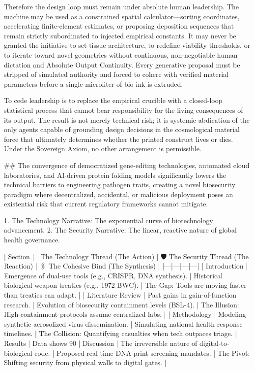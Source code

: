 Therefore the design loop must remain under absolute human leadership. The machine may be used as a constrained spatial calculator—sorting coordinates, accelerating finite-element estimates, or proposing deposition sequences that remain strictly subordinated to injected empirical constants. It may never be granted the initiative to set tissue architecture, to redefine viability thresholds, or to iterate toward novel geometries without continuous, non-negotiable human dictation and Absolute Output Continuity. Every generative proposal must be stripped of simulated authority and forced to cohere with verified material parameters before a single microliter of bio-ink is extruded.

To cede leadership is to replace the empirical crucible with a closed-loop statistical process that cannot bear responsibility for the living consequences of its output. The result is not merely technical risk; it is systemic abdication of the only agents capable of grounding design decisions in the cosmological material force that ultimately determines whether the printed construct lives or dies. Under the Sovereign Axiom, no other arrangement is permissible.

## The convergence of democratized gene-editing technologies, automated cloud laboratories, and AI-driven protein folding models significantly lowers the technical barriers to engineering pathogen traits, creating a novel biosecurity paradigm where decentralized, accidental, or malicious deployment poses an existential risk that current regulatory frameworks cannot mitigate.

   1. The Technology Narrative: The exponential curve of biotechnology advancement.
   2. The Security Narrative: The linear, reactive nature of global health governance.

| Section | 🧬 The Technology Thread (The Action) | 🛡️ The Security Thread (The Reaction) | 🖇️ The Cohesive Bind (The Synthesis) |
|---|---|---|---|
| Introduction | Emergence of dual-use tools (e.g., CRISPR, DNA synthesis). | Historical biological weapon treaties (e.g., 1972 BWC). | The Gap: Tools are moving faster than treaties can adapt. |
| Literature Review | Past gains in gain-of-function research. | Evolution of biosecurity containment levels (BSL-4). | The Illusion: High-containment protocols assume centralized labs. |
| Methodology | Modeling synthetic aerosolized virus dissemination. | Simulating national health response timelines. | The Collision: Quantifying casualties when tech outpaces triage. |
| Results | Data shows 90%
| Discussion | The irreversible nature of digital-to-biological code. | Proposed real-time DNA print-screening mandates. | The Pivot: Shifting security from physical walls to digital gates. |


